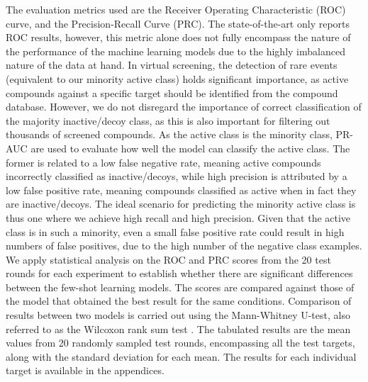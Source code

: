 The evaluation metrics used are the Receiver Operating Characteristic (ROC) curve, and the Precision-Recall Curve (PRC). The state-of-the-art \cite{altae2017low} only reports ROC results, however, this metric alone does not fully encompass the nature of the performance of the machine learning models due to the highly imbalanced nature of the data at hand. In virtual screening, the detection of rare events (equivalent to our minority active class) holds significant importance, as active compounds against a specific target should be identified from the compound database. However, we do not disregard the importance of correct classification of the majority inactive/decoy class, as this is also important for filtering out thousands of screened compounds. As the active class is the minority class, PR-AUC are used to evaluate how well the model can classify the active class. The former is related to a low false negative rate, meaning active compounds incorrectly classified as inactive/decoys, while high precision is attributed by a low false positive rate, meaning compounds classified as active when in fact they are inactive/decoys. The ideal scenario for predicting the minority active class is thus one where we achieve high recall and high precision. Given that the active class is in such a minority, even a small false positive rate could result in high numbers of false positives, due to the high number of the negative class examples. We apply statistical analysis on the ROC and PRC scores from the 20 test rounds for each experiment to establish whether there are significant differences between the few-shot learning models. The scores are compared against those of the model that obtained the best result for the same conditions. Comparison of results between two models is carried out using the Mann-Whitney U-test, also referred to as the Wilcoxon rank sum test \citep{mann1947test}. The tabulated results are the mean values from 20 randomly sampled test rounds, encompassing all the test targets, along with the standard deviation for each mean. The results for each individual target is available in the appendices.

